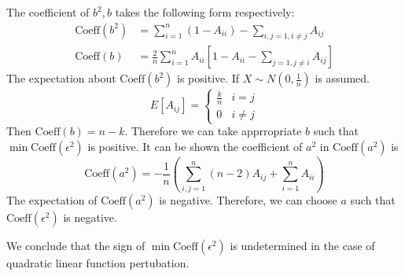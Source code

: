 \documentclass{article}
\begin{document}
The coefficient of $b^2, b$ takes the following form respectively:
\begin{align*}
\textrm{Coeff}(b^2) & = \sum_{i=1}^n (1-A_{ii}) - \sum_{i,j=1, i\neq j} A_{ij} \\
\textrm{Coeff}(b) & = \frac{2}{n}\sum_{i=1}^n A_{ii} [ 1 - A_{ii} - \sum_{j=1, j\neq i} A_{ij} ]
\end{align*}
The expectation about $\textrm{Coeff}(b^2)$ is positive. If $ X \sim N(0, \frac{1}{n})$ is assumed. 
$$
E[A_{ij}]= \begin{cases}
\frac{k}{n} & i = j\\
0 & i\neq j 
\end{cases}
$$
Then $\textrm{Coeff}(b)  = n-k$. 
Therefore we can take apprropriate $b$ such that $\min \textrm{Coeff}(\epsilon^2)$ is positive.
It can be shown the coefficient of $a^2$ in $\textrm{Coeff}(a^2)$ is 
\begin{equation}
\textrm{Coeff}(a^2) = -\frac{1}{n}( \sum_{i,j=1}^n (n-2) A_{ij} + \sum_{i=1}^n A_{ii})
\end{equation}
The expectation of $\textrm{Coeff}(a^2)$ is negative. Therefore, we can choose $a$ such that $\textrm{Coeff}(\epsilon^2)$ is negative.

We conclude that the sign of $\min \textrm{Coeff}(\epsilon^2)$ is undetermined in the case of quadratic linear function pertubation.
\end{document}
